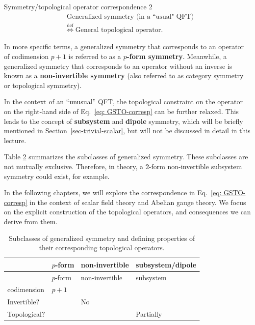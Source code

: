 \documentclass[11pt,toc=bibliography]{scrbook}
\numberwithin{equation}{section}
\begin{document}
\begin{important}{Symmetry/topological operator correspondence 2}
  \begin{equation}
    \begin{split}
      & \text{Generalized symmetry (in a ``usual" QFT)} \\
      & \stackrel{\text{def}}{\Longleftrightarrow}\;
      \text{General topological operator.}
      \label{eq: GSTO-corresp}
    \end{split}
  \end{equation}
\end{important}

In more specific terms, a generalized symmetry that corresponds to an
operator of codimension \(p+1\) is referred to as a \textbf{\(p\)-form
  symmetry}. Meanwhile, a generalized symmetry that corresponds to an
operator without an inverse is known as a \textbf{non-invertible
  symmetry} (also referred to as category symmetry or topological
symmetry).

In the context of an ``unusual'' QFT, the topological constraint on the
operator on the right-hand side of Eq.~\eqref{eq: GSTO-corresp} can be
further relaxed. This leads to the concept of \textbf{subsystem} and \textbf{dipole} 
symmetry, which will be briefly mentioned in
Section~\ref{sec-trivial-scalar}, but will not be discussed in detail in
this lecture.

Table \ref{tbl: sym-classes} summarizes the subclasses of generalized symmetry.
These subclasses are not mutually exclusive. Therefore, in theory, a
2-form non-invertible subsystem symmetry could exist, for example.

In the following chapters, we will explore the correspondence in Eq.~\eqref{eq: GSTO-corresp} in the context of scalar field theory and Abelian gauge theory. We focus on the explicit construction of the topological operators, and consequences we can derive from them. 

\begin{table}
\begin{longtable}[]{@{}llll@{}}
  \caption{\label{tbl: sym-classes}Subclasses of generalized symmetry and
    defining properties of their corresponding topological
    operators.}\tabularnewline
  \toprule\noalign{}
               & \(p\)-form & non-invertible & subsystem/dipole \\
  \midrule\noalign{}
  \endfirsthead
  \toprule\noalign{}
               & \(p\)-form & non-invertible & subsystem \\
  \midrule\noalign{}
  \endhead
  \bottomrule\noalign{}
  \endlastfoot
  codimension  & \(p+1\)    &                &           \\
  Invertible?  &            & No             &           \\
  Topological? &            &                & Partially \\
\end{longtable}
\end{table}
\end{document}
